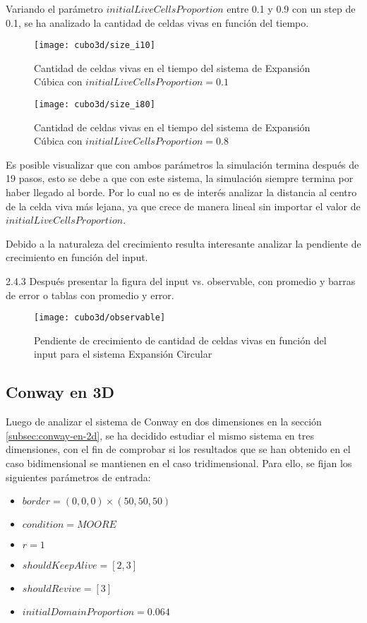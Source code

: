 Variando el parámetro $initialLiveCellsProportion$ entre 0.1 y 0.9 con un step de 0.1, se ha analizado la cantidad de celdas vivas en función
del tiempo.

\begin{figure}[H]
    \centering
    \texttt{[image: cubo3d/size\_i10]}
    \caption{Cantidad de celdas vivas en el tiempo del sistema de Expansión Cúbica con $initialLiveCellsProportion = 0.1$}
    \label{fig:cubo3d_i10}
\end{figure}
\begin{figure}[H]
    \centering
    \texttt{[image: cubo3d/size\_i80]}
    \caption{Cantidad de celdas vivas en el tiempo del sistema de Expansión Cúbica con $initialLiveCellsProportion = 0.8$}
    \label{fig:cubo3d_i80}
\end{figure}


Es posible visualizar que con ambos parámetros la simulación termina después de 19 pasos, esto se debe a que con este sistema, la simulación
siempre termina por haber llegado al borde. Por lo cual no es de interés analizar la distancia al centro de la celda viva más lejana, ya que
crece de manera lineal sin importar el valor de $initialLiveCellsProportion$.

Debido a la naturaleza del crecimiento resulta interesante analizar la pendiente de crecimiento en función del input.

2.4.3 Después presentar la figura del input vs. observable, con promedio y barras de error o tablas 
con promedio y error. 


\begin{figure}[H]
    \centering
    \texttt{[image: cubo3d/observable]}
    \caption{Pendiente de crecimiento de cantidad de celdas vivas en función del input para el sistema Expansión Circular}
    \label{fig:cubo3d_observable}
\end{figure}


\subsection{Conway en 3D}\label{subsec:conway-en-3d}

Luego de analizar el sistema de Conway en dos dimensiones en la sección \ref{subsec:conway-en-2d},
se ha decidido estudiar el mismo sistema en tres dimensiones, con el fin de comprobar si los resultados
que se han obtenido en el caso bidimensional se mantienen en el caso tridimensional.
Para ello, se fijan los siguientes parámetros de entrada:
\begin{itemize}
    \item $border = (0, 0, 0) \times (50, 50, 50)$
    \item $condition = MOORE$
    \item $r = 1$
    \item $shouldKeepAlive = [2, 3]$
    \item $shouldRevive = [3]$
    \item $initialDomainProportion = 0.064$
\end{itemize}

